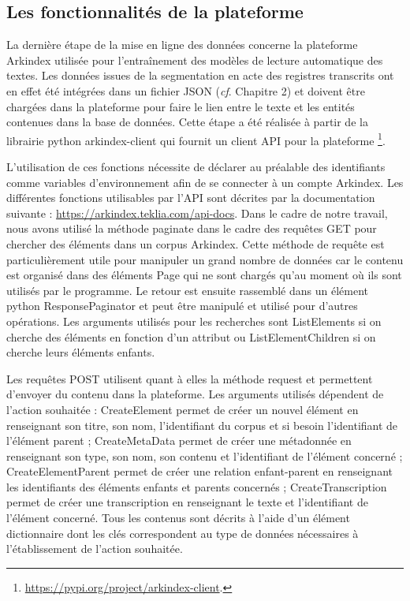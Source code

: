 \documentclass[a4paper,12pt,twoside]{book}
\begin{document}
	\subsection{Les fonctionnalités de la plateforme}
	
	La dernière étape de la mise en ligne des données concerne la plateforme Arkindex utilisée pour l'entraînement des modèles de lecture automatique des textes. Les données issues de la segmentation en acte des registres transcrits ont en effet été intégrées dans un fichier JSON (\textit{cf}. Chapitre 2) et doivent être chargées dans la plateforme pour faire le lien entre le texte et les entités contenues dans la base de données. Cette étape a été réalisée à partir de la librairie python arkindex-client qui fournit un client API pour la plateforme \footnote{\url{https://pypi.org/project/arkindex-client}.}.
	
	L'utilisation de ces fonctions nécessite de déclarer au préalable des identifiants comme variables d'environnement afin de se connecter à un compte Arkindex. Les différentes fonctions utilisables par l'API sont décrites par la documentation suivante : \url{https://arkindex.teklia.com/api-docs}. Dans le cadre de notre travail, nous avons utilisé la méthode \og paginate\fg{} dans le cadre des requêtes GET pour chercher des éléments dans un corpus Arkindex. Cette méthode de requête est particulièrement utile pour manipuler un grand nombre de données car le contenu est organisé dans des éléments \og Page\fg{} qui ne sont chargés qu'au moment où ils sont utilisés par le programme. Le retour est ensuite rassemblé dans un élément python ResponsePaginator et peut être manipulé et utilisé pour d'autres opérations. Les arguments utilisés pour les recherches sont \og ListElements \fg{} si on cherche des éléments en fonction d'un attribut ou \og ListElementChildren \fg{} si on cherche leurs éléments enfants.
	
	Les requêtes POST utilisent quant à elles la méthode \og request\fg{} et permettent d'envoyer du contenu dans la plateforme. Les arguments utilisés dépendent de l'action souhaitée : \og CreateElement\fg{} permet de créer un nouvel élément en renseignant son titre, son nom, l'identifiant du corpus et si besoin l'identifiant de l'élément parent ; \og CreateMetaData\fg{} permet de créer une métadonnée en renseignant son type, son nom, son contenu et l'identifiant de l'élément concerné ; \og CreateElementParent\fg{} permet de créer une relation enfant-parent en renseignant les identifiants des éléments enfants et parents concernés ; \og CreateTranscription\fg{} permet de créer une transcription en renseignant le texte et l'identifiant de l'élément concerné. Tous les contenus sont décrits à l'aide d'un élément dictionnaire dont les clés correspondent au type de données nécessaires à l'établissement de l'action souhaitée.
	
\end{document}
